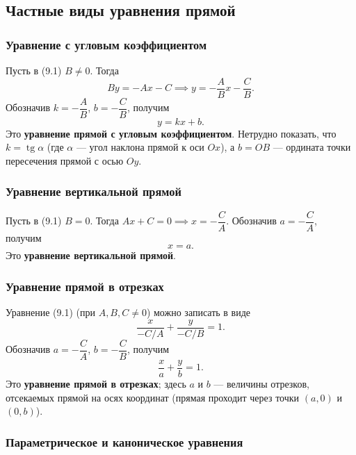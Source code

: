 \documentclass[12pt,a4paper]{article}
\begin{document}
\subsection*{Частные виды уравнения прямой}

\subsubsection*{Уравнение с угловым коэффициентом}

Пусть в (9.1) $B \neq 0$. Тогда
\[
  By = -Ax - C \implies y = -\frac{A}{B}x - \frac{C}{B}.
\]
Обозначив $k = -\dfrac{A}{B}$, $b = -\dfrac{C}{B}$, получим
\begin{equation}
  y = kx + b. \tag{9.3}
\end{equation}
Это \textbf{уравнение прямой с угловым коэффициентом}. Нетрудно показать,
что $k = \operatorname{tg}\alpha$ (где $\alpha$ — угол наклона прямой к оси
$Ox$), а $b = OB$ — ордината точки пересечения прямой с осью $Oy$.

\subsubsection*{Уравнение вертикальной прямой}

Пусть в (9.1) $B = 0$. Тогда $Ax + C = 0 \implies x = -\dfrac{C}{A}$.
Обозначив $a = -\dfrac{C}{A}$, получим
\begin{equation}
  x = a. \tag{9.4}
\end{equation}
Это \textbf{уравнение вертикальной прямой}.

\subsubsection*{Уравнение прямой в отрезках}

Уравнение (9.1) (при $A, B, C \neq 0$) можно записать в виде
\[
  \frac{x}{-C/A} + \frac{y}{-C/B} = 1.
\]
Обозначив $a = -\dfrac{C}{A}$, $b = -\dfrac{C}{B}$, получим
\begin{equation}
  \frac{x}{a} + \frac{y}{b} = 1. \tag{9.5}
\end{equation}
Это \textbf{уравнение прямой в отрезках}; здесь $a$ и $b$ — величины
отрезков, отсекаемых прямой на осях координат (прямая проходит через точки
$(a, 0)$ и $(0, b)$).

\subsubsection*{Параметрическое и каноническое уравнения}
\end{document}

